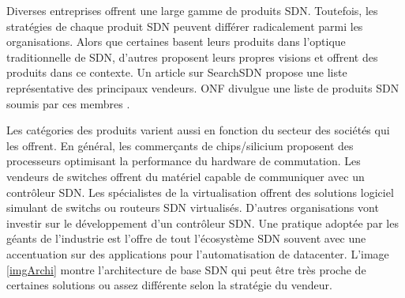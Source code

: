 

Diverses entreprises offrent une large gamme de produits SDN. Toutefois, les stratégies de chaque produit SDN peuvent différer radicalement parmi les organisations. Alors que certaines basent leurs produits dans l'optique traditionnelle de SDN, d'autres proposent leurs propres visions et offrent des produits dans ce contexte. Un article sur SearchSDN \cite{42Vendors} propose une liste représentative des principaux vendeurs. ONF divulgue une liste de produits SDN soumis par ces membres \cite{ProductDirectory}.  

Les catégories des produits varient aussi en fonction du secteur des sociétés qui les offrent. En général, les commerçants de chips/silicium proposent des processeurs optimisant la performance du hardware de commutation.  Les vendeurs de switches offrent du matériel capable de communiquer avec un contrôleur SDN. Les spécialistes de la \gls{virtualisation} offrent des solutions logiciel simulant de switchs ou routeurs SDN virtualisés. D'autres organisations vont investir sur le développement d'un contrôleur SDN. Une pratique adoptée par les géants de l'industrie est l'offre de tout l'écosystème SDN souvent avec une accentuation sur des applications pour l'automatisation de \gls{datacenter}.\cite{2013GuideSDNNVEcosystem} L'image \ref{imgArchi} montre l'architecture de base SDN qui peut être très proche de certaines solutions ou assez différente selon la stratégie du vendeur.
 
